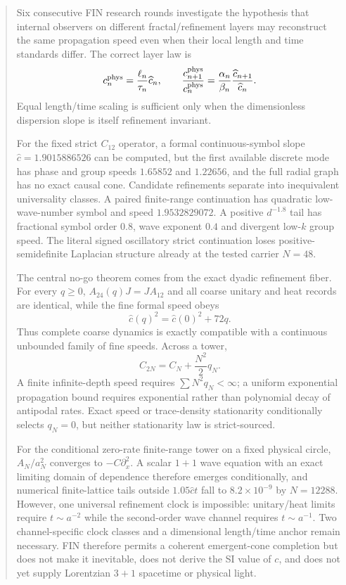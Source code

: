 \documentclass[11pt,a4paper]{article}
\theoremstyle{remark}\newtheorem{remark}[theorem]{Remark}
\begin{document}
\begin{abstract}
Six consecutive FIN research rounds investigate the hypothesis that internal observers on different fractal/refinement layers may reconstruct the same propagation speed even when their local length and time standards differ. The correct layer law is
\[
c_n^{\rm phys}=\frac{\ell_n}{\tau_n}\widehat c_n,
\qquad
\frac{c_{n+1}^{\rm phys}}{c_n^{\rm phys}}
=\frac{\alpha_n}{\beta_n}\frac{\widehat c_{n+1}}{\widehat c_n}.
\]
Equal length/time scaling is sufficient only when the dimensionless dispersion slope is itself refinement invariant.

For the fixed strict $C_{12}$ operator, a formal continuous-symbol slope $\widehat c=1.9015886526$ can be computed, but the first available discrete mode has phase and group speeds $1.65852$ and $1.22656$, and the full radial graph has no exact causal cone. Candidate refinements separate into inequivalent universality classes. A paired finite-range continuation has quadratic low-wave-number symbol and speed $1.9532829072$. A positive $d^{-1.8}$ tail has fractional symbol order $0.8$, wave exponent $0.4$ and divergent low-$k$ group speed. The literal signed oscillatory strict continuation loses positive-semidefinite Laplacian structure already at the tested carrier $N=48$.

The central no-go theorem comes from the exact dyadic refinement fiber. For every $q\ge0$, $A_{24}(q)J=JA_{12}$ and all coarse unitary and heat records are identical, while the fine formal speed obeys
\[
\widehat c(q)^2=\widehat c(0)^2+72q.
\]
Thus complete coarse dynamics is exactly compatible with a continuous unbounded family of fine speeds. Across a tower,
\[
C_{2N}=C_N+\frac{N^2}{2}q_N.
\]
A finite infinite-depth speed requires $\sum N^2q_N<\infty$; a uniform exponential propagation bound requires exponential rather than polynomial decay of antipodal rates. Exact speed or trace-density stationarity conditionally selects $q_N=0$, but neither stationarity law is strict-sourced.

For the conditional zero-rate finite-range tower on a fixed physical circle, $A_N/a_N^2$ converges to $-C\partial_x^2$. A scalar $1+1$ wave equation with an exact limiting domain of dependence therefore emerges conditionally, and numerical finite-lattice tails outside $1.05\widehat c t$ fall to $8.2\times10^{-9}$ by $N=12288$. However, one universal refinement clock is impossible: unitary/heat limits require $t\sim a^{-2}$ while the second-order wave channel requires $t\sim a^{-1}$. Two channel-specific clock classes and a dimensional length/time anchor remain necessary. FIN therefore permits a coherent emergent-cone completion but does not make it inevitable, does not derive the SI value of $c$, and does not yet supply Lorentzian $3+1$ spacetime or physical light.
\end{abstract}
\end{document}
